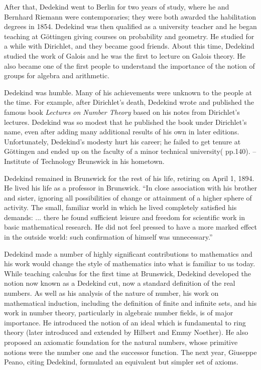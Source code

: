 \documentclass{article}
\begin{document}
After that, Dedekind went to Berlin for two years of study, where he and Bernhard Riemann were contemporaries; they were both awarded the habilitation degrees in 1854. Dedekind was then qualified as a university teacher and he began teaching at Göttingen giving courses on probability and geometry. He studied for a while with Dirichlet, and they became good friends. About this time, Dedekind studied the work of Galois and he was the first to lecture on Galois theory. He also became one of the first people to understand the importance of the notion of groups for algebra and arithmetic.

Dedekind was humble. Many of his achievements were unknown to the people at the time. For example, after Dirichlet's death, Dedekind wrote and published the famous book {\em Lectures on Number Theory} based on his notes from Dirichlet's lectures. Dedekind was so modest that he published the book under Dirichlet’s name, even after adding many additional results of his own in later editions. Unfortunately, Dedekind’s modesty hurt his career; he failed to get tenure at Göttingen and ended up on the faculty of a minor technical university(\cite{StepanovRose15} pp.140). -- Institute of Technology Brunswick in his hometown.

Dedekind remained in Brunswick for the rest of his life, retiring on April 1, 1894. He lived his life as a professor in Brunswick.
``In close association with his brother and sister, ignoring all possibilities of change or attainment of a higher sphere of activity. The small, familiar world in which he lived completely satisfied his demands: ... there he found sufficient leisure and freedom for scientific work in basic mathematical research. He did not feel pressed to have a more marked effect in the outside world: such confirmation of himself was unnecessary.''

Dedekind made a number of highly significant contributions to mathematics and his work would change the style of mathematics into what is familiar to us today. While teaching calculus for the first time at Brunswick, Dedekind developed the notion now known as a Dedekind cut, now a standard definition of the real numbers. As well as his analysis of the nature of number, his work on mathematical induction, including the definition of finite and infinite sets, and his work in number theory, particularly in algebraic number fields, is of major importance. He introduced the notion of an ideal which is fundamental to ring theory (later introduced and extended by Hilbert and Emmy Noether). He also proposed an axiomatic foundation for the natural numbers, whose primitive notions were the number one and the successor function. The next year, Giuseppe Peano, citing Dedekind, formulated an equivalent but simpler set of axioms.
\end{document}
